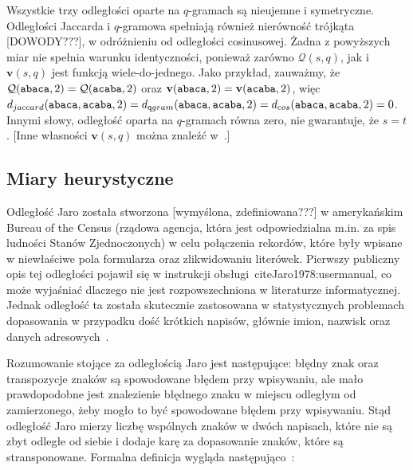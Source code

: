 \documentclass{praca1}
\begin{document}
Wszystkie trzy odległości oparte na $q$-gramach są nieujemne i symetryczne. Odległości Jaccarda i $q$-gramowa spełniają również nierówność trójkąta [DOWODY???], w odróżnieniu od odległości cosinusowej. Żadna z powyższych miar nie spełnia warunku identyczności, ponieważ zarówno $\mathcal{Q}(s,q)$, jak i $\mathbf{v}(s,q)$ jest funkcją wiele-do-jednego. Jako przykład, zauważmy, że $\mathcal{Q}(\verb|abaca|,2) = \mathcal{Q}(\verb|acaba|,2)$ oraz $\mathbf{v}(\verb|abaca|,2) = \mathbf{v}(\verb|acaba|,2)$, więc $d_{jaccard}(\verb|abaca|, \verb|acaba|, 2) = d_{\mathtt{q}gram}(\verb|abaca|, \verb|acaba|, 2) = d_{cos}(\verb|abaca|, \verb|acaba|, 2) = 0$. Innymi słowy, odległość oparta na $q$-gramach równa zero, nie gwarantuje, że $s = t$. [Inne własności $\mathbf{v}(s,q)$ można znaleźć w~\cite{Ukkonen1992:approxqgrams}.]


\subsection{Miary heurystyczne}


Odległość Jaro została stworzona [wymyślona, zdefiniowana???] w amerykańskim Bureau of the Census (rządowa agencja, która jest odpowiedzialna m.in. za spis ludności Stanów Zjednoczonych) w celu połączenia rekordów, które były wpisane w niewłaściwe pola formularza oraz zlikwidowaniu literówek. Pierwszy publiczny opis tej odległości pojawił się w instrukcji obsługi~cite{Jaro1978:usermanual}, co może wyjaśniać dlaczego nie jest rozpowszechniona w literaturze informatycznej. Jednak odległość ta została skutecznie zastosowana w statystycznych problemach dopasowania w przypadku dość krótkich napisów, głównie imion, nazwisk oraz danych adresowych~\cite{Loo2014:stringdist}.

Rozumowanie stojące za odległością Jaro jest następujące: błędny znak oraz transpozycje znaków są spowodowane błędem przy wpisywaniu, ale mało prawdopodobne jest znalezienie błędnego znaku w miejscu odległym od zamierzonego, żeby mogło to być spowodowane błędem przy wpisywaniu. Stąd odległość Jaro mierzy liczbę wspólnych znaków w dwóch napisach, które nie są zbyt odległe od siebie i dodaje karę za dopasowanie znaków, które są stransponowane. Formalna definicja wygląda następująco~\cite{Loo2014:stringdist}:
\end{document}
